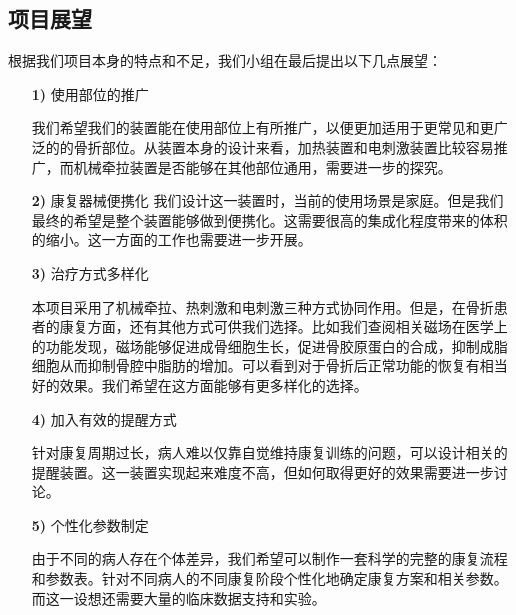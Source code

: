 \documentclass[UTF8]{ctexart}
\begin{document}
    \subsection{项目展望}
        根据我们项目本身的特点和不足，我们小组在最后提出以下几点展望：
        \begin{enumerate}
            \item[\textbf{1)}]使用部位的推广
    
                我们希望我们的装置能在使用部位上有所推广，以便更加适用于更常见和更广泛的的骨折部位。从装置本身的设计来看，加热装置和电刺激装置比较容易推广，而机械牵拉装置是否能够在其他部位通用，需要进一步的探究。
            

            \item[\textbf{2)}]康复器械便携化
                我们设计这一装置时，当前的使用场景是家庭。但是我们最终的希望是整个装置能够做到便携化。这需要很高的集成化程度带来的体积的缩小。这一方面的工作也需要进一步开展。 

            \item[\textbf{3)}]治疗方式多样化
            
            本项目采用了机械牵拉、热刺激和电刺激三种方式协同作用。但是，在骨折患者的康复方面，还有其他方式可供我们选择。比如我们查阅相关磁场在医学上的功能发现，磁场能够促进成骨细胞生长，促进骨胶原蛋白的合成，抑制成脂细胞从而抑制骨腔中脂肪的增加。可以看到对于骨折后正常功能的恢复有相当好的效果。我们希望在这方面能够有更多样化的选择。
            

            \item[\textbf{4)}]加入有效的提醒方式
                
                针对康复周期过长，病人难以仅靠自觉维持康复训练的问题，可以设计相关的提醒装置。这一装置实现起来难度不高，但如何取得更好的效果需要进一步讨论。
            
            \item[\textbf{5)}]个性化参数制定
                
                由于不同的病人存在个体差异，我们希望可以制作一套科学的完整的康复流程和参数表。针对不同病人的不同康复阶段个性化地确定康复方案和相关参数。而这一设想还需要大量的临床数据支持和实验。
        \end{enumerate}



    
\end{document}
